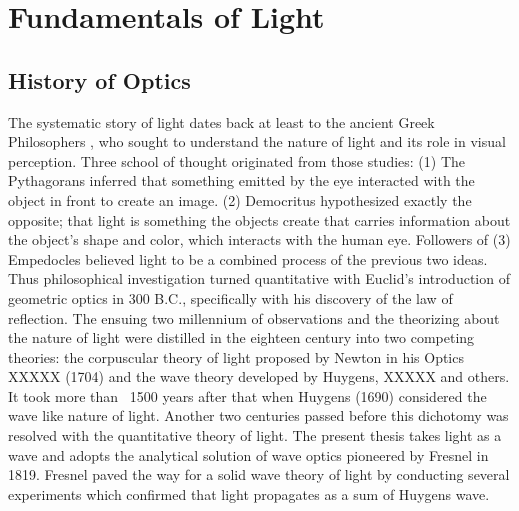 \chapter{Fundamentals of Light}
\label{ch:fundamentals_of_light}







\section{History of Optics}

The systematic story of light dates back at least to the ancient Greek Philosophers \cite{Vohnsen_2004}, who sought to understand the nature of light and its role in visual perception. Three school of thought originated from those studies: (1) The Pythagorans inferred that something emitted by the eye interacted with the object in front to create an image. (2) Democritus hypothesized exactly the opposite; that light is something the objects create that carries information about the object's shape and color, which interacts with the human eye. Followers of (3)  Empedocles believed light to be a combined process of the previous two ideas. Thus philosophical investigation turned quantitative  with Euclid's introduction of geometric optics in 300 B.C.\cite{Abetti1971}, specifically with his discovery of the law of reflection. The ensuing two millennium of observations and the theorizing about the nature of light were distilled in the eighteen century into two competing theories: the corpuscular theory of light proposed by Newton in his Optics XXXXX (1704) and the wave theory developed by Huygens, XXXXX and others. It took more than ~1500 years after that when Huygens (1690) considered the wave like nature of light. Another two centuries passed before this dichotomy was resolved with the quantitative theory of light. The present thesis takes light as a wave and adopts the analytical solution of wave optics pioneered by Fresnel in 1819. Fresnel paved the way for a solid wave theory of light by conducting several experiments which confirmed that light propagates as a sum of Huygens wave. 

